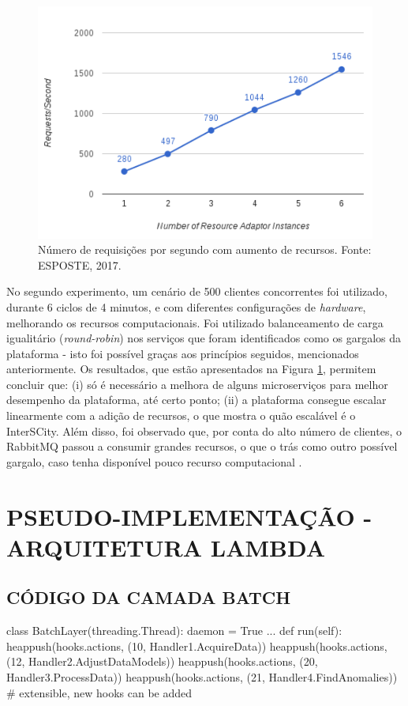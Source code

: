 \begin{apendicesenv}
\begin{figure}
  \centering
    \includegraphics[scale=0.4]{figuras/benchmark2.png}
    \caption{Número de requisições por segundo com aumento de recursos. Fonte: ESPOSTE, 2017.}
  \label{fig:benchmark2}
\end{figure}

No segundo experimento, um cenário de 500 clientes concorrentes foi utilizado, 
durante 6 ciclos de 4 minutos, e com diferentes configurações de
\textit{hardware}, melhorando os recursos computacionais. Foi utilizado
balanceamento de carga igualitário (\textit{round-robin}) nos serviços
que foram identificados como os gargalos da plataforma - isto foi possível
graças aos princípios seguidos, mencionados anteriormente. Os resultados,
que estão apresentados na Figura \ref{fig:benchmark2}, permitem concluir que:
(i) só é necessário a melhora de alguns microserviços para melhor desempenho
da plataforma, até certo ponto; (ii) a plataforma consegue escalar linearmente
com a adição de recursos, o que mostra o quão escalável é o InterSCity. Além
disso, foi observado que, por conta do alto número de clientes, o RabbitMQ
passou a consumir grandes recursos, o que o trás como outro possível gargalo,
caso tenha disponível pouco recurso computacional \cite{delesposte2017}.

\chapter{PSEUDO-IMPLEMENTAÇÃO - ARQUITETURA LAMBDA}
\label{appendix:impl}

\section{CÓDIGO DA CAMADA BATCH}
\begin{python}
class BatchLayer(threading.Thread):
    daemon = True
    ...
    def run(self):
        heappush(hooks.actions, (10, Handler1.AcquireData))
        heappush(hooks.actions, (12, Handler2.AdjustDataModels))
        heappush(hooks.actions, (20, Handler3.ProcessData))
        heappush(hooks.actions, (21, Handler4.FindAnomalies))
        # extensible, new hooks can be added


\end{python}
\end{apendicesenv}
